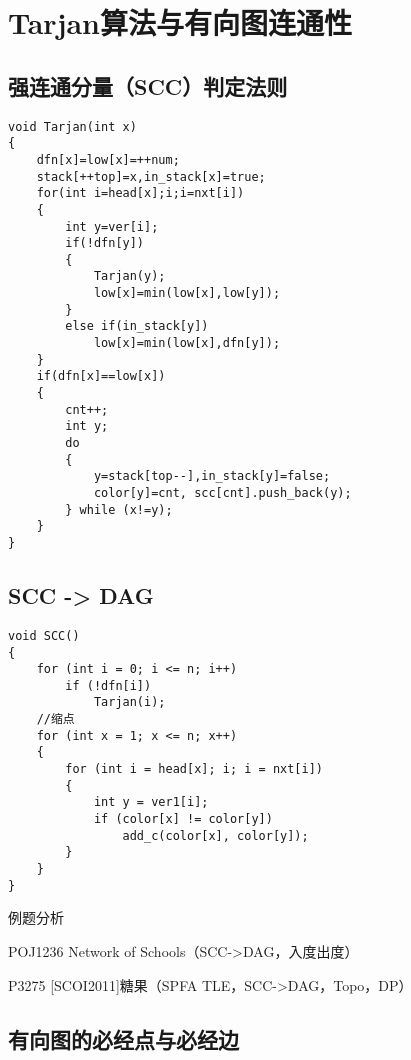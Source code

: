 \section{Tarjan算法与有向图连通性}
\subsection{强连通分量（SCC）判定法则}
\begin{lstlisting}
void Tarjan(int x)
{
    dfn[x]=low[x]=++num;
    stack[++top]=x,in_stack[x]=true;
    for(int i=head[x];i;i=nxt[i])
    {
        int y=ver[i];
        if(!dfn[y])
        {
            Tarjan(y);
            low[x]=min(low[x],low[y]);
        }
        else if(in_stack[y])
            low[x]=min(low[x],dfn[y]);
    }
    if(dfn[x]==low[x])
    {
        cnt++;
        int y;
        do
        {
            y=stack[top--],in_stack[y]=false;
            color[y]=cnt, scc[cnt].push_back(y);
        } while (x!=y);
    }
}
\end{lstlisting}
\subsection{SCC -> DAG}
\begin{lstlisting}
void SCC()
{
    for (int i = 0; i <= n; i++)
        if (!dfn[i])
            Tarjan(i);
    //缩点
    for (int x = 1; x <= n; x++)
    {
        for (int i = head[x]; i; i = nxt[i])
        {
            int y = ver1[i];
            if (color[x] != color[y])
                add_c(color[x], color[y]);
        }
    }
}
\end{lstlisting}
例题分析

POJ1236 Network of Schools（SCC->DAG，入度出度）

P3275 [SCOI2011]糖果（SPFA TLE，SCC->DAG，Topo，DP）

\subsection{有向图的必经点与必经边}